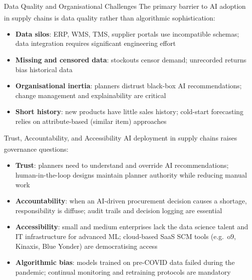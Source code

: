 \begin{v3topic}{Data Quality and Organisational Challenges}
    The primary barrier to AI adoption in supply chains is data quality rather than algorithmic sophistication\textsuperscript{\cite[][pp.~620--625]{chopraSupplyChainManagement2019}}:
    \begin{itemize}
        \item \textbf{Data silos}: ERP, WMS, TMS, supplier portals use incompatible schemas; data integration requires significant engineering effort
        \item \textbf{Missing and censored data}: stockouts censor demand; unrecorded returns bias historical data
        \item \textbf{Organisational inertia}: planners distrust black-box AI recommendations; change management and explainability are critical
        \item \textbf{Short history}: new products have little sales history; cold-start forecasting relies on attribute-based (similar item) approaches
    \end{itemize}

\end{v3topic}
\begin{v3topic}{Trust, Accountability, and Accessibility}
    AI deployment in supply chains raises governance questions\textsuperscript{\cite[][pp.~625--630]{chopraSupplyChainManagement2019}}:
    \begin{itemize}
        \item \textbf{Trust}: planners need to understand and override AI recommendations; human-in-the-loop designs maintain planner authority while reducing manual work
        \item \textbf{Accountability}: when an AI-driven procurement decision causes a shortage, responsibility is diffuse; audit trails and decision logging are essential
        \item \textbf{Accessibility}: small and medium enterprises lack the data science talent and IT infrastructure for advanced ML; cloud-based SaaS SCM tools (e.g.\ o9, Kinaxis, Blue Yonder) are democratising access
        \item \textbf{Algorithmic bias}: models trained on pre-COVID data failed during the pandemic; continual monitoring and retraining protocols are mandatory
    \end{itemize}

\end{v3topic}

%
